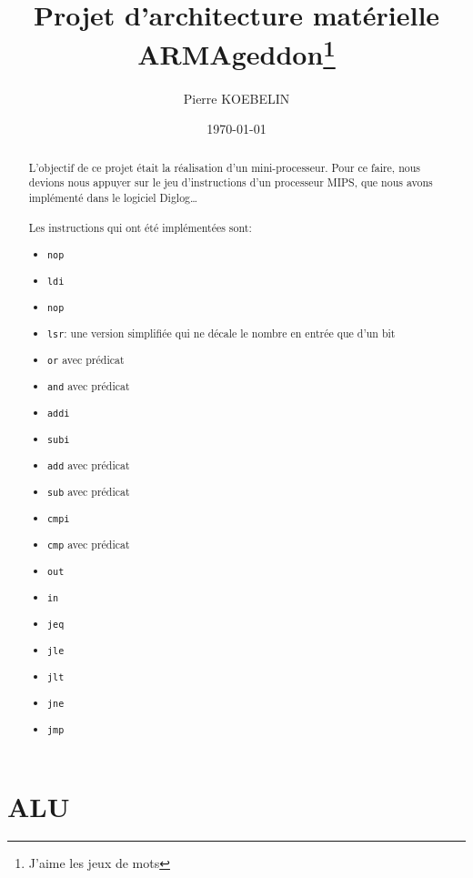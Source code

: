\documentclass[11pt, a4paper, twoside, titlepage]{article}
\begin{document}
\title{{\titlefont Projet d'architecture matérielle}\\ARMAgeddon\thanks{J'aime les jeux de mots}}
\author{Pierre KOEBELIN}
\date{\today}
\maketitle

\begin{abstract}
L’objectif de ce projet était la réalisation d’un mini-processeur. Pour ce faire, nous devions nous appuyer sur le jeu d'instructions d'un processeur MIPS, que nous avons implémenté dans le logiciel Diglog\ldots\\
\\
Les instructions qui ont été implémentées sont:
\begin{itemize}
        \item{\texttt{nop}}
        \item{\texttt{ldi}}
        \item{\texttt{nop}}
        \item{\texttt{lsr}: une version simplifiée qui ne décale le nombre en entrée que d'un bit}
        \item{\texttt{or} avec prédicat}
        \item{\texttt{and} avec prédicat}
        \item{\texttt{addi}}
        \item{\texttt{subi}}
        \item{\texttt{add} avec prédicat}
        \item{\texttt{sub} avec prédicat}
        \item{\texttt{cmpi}}
        \item{\texttt{cmp} avec prédicat}
        \item{\texttt{out}}
        \item{\texttt{in}}
        \item{\texttt{jeq}}
        \item{\texttt{jle}}
        \item{\texttt{jlt}}
        \item{\texttt{jne}}
        \item{\texttt{jmp}}
\end{itemize}
\end{abstract}

\tableofcontents

\newpage
\section{ALU}
\end{document}
